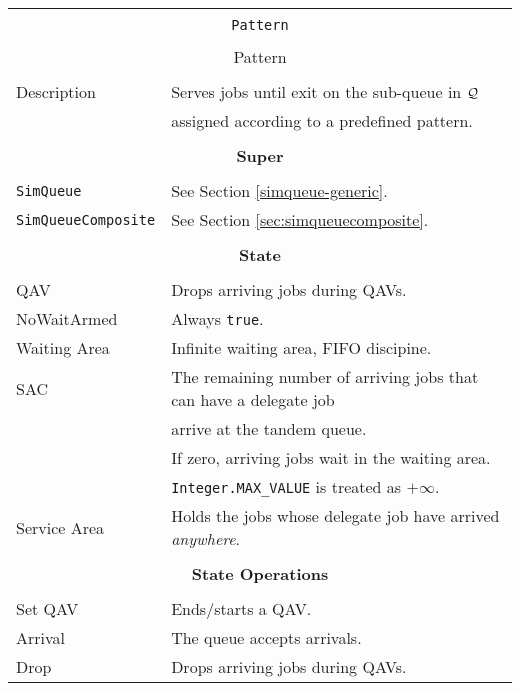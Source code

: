 \begin{tabular}{|l|l|}
	\hline
	\multicolumn{2}{|c|}{} \\
	\multicolumn{2}{|c|}{\lstinline[basicstyle=\large]{Pattern}} \\
	\multicolumn{2}{|c|}{} \\
	\multicolumn{2}{|c|}{Pattern} \\
	\multicolumn{2}{|c|}{} \\
	\hline
	Description & Serves jobs until exit on the sub-queue in $\cal{Q}$ \\
	& assigned according to a predefined pattern. \\
	\hline
	\multicolumn{2}{|c|}{} \\
	\multicolumn{2}{|c|}{\bf Super} \\
	\multicolumn{2}{|c|}{} \\
	\hline
	\lstinline|SimQueue| & See Section \ref{simqueue-generic}. \\
	\lstinline|SimQueueComposite| & See Section \ref{sec:simqueuecomposite}. \\
	\hline
	\multicolumn{2}{|c|}{} \\
	\multicolumn{2}{|c|}{\bf State} \\
	\multicolumn{2}{|c|}{} \\
	\hline
	QAV & Drops arriving jobs during QAVs. \\
	\hline
	NoWaitArmed & Always \lstinline|true|. \\
	\hline
	Waiting Area & Infinite waiting area, FIFO discipine. \\
	\hline
	SAC & The remaining number of arriving jobs that can have a delegate job \\
	& arrive at the tandem queue. \\
	& If zero, arriving jobs wait in the waiting area. \\
	& \lstinline|Integer.MAX_VALUE| is treated as $+\infty$. \\
	\hline
	Service Area & Holds the jobs whose delegate job have arrived {\em anywhere}. \\
	\hline
	\multicolumn{2}{|c|}{} \\
	\multicolumn{2}{|c|}{\bf State Operations} \\
	\multicolumn{2}{|c|}{} \\
	\hline
	Set QAV & Ends/starts a QAV. \\
	\hline
	Arrival & The queue accepts arrivals. \\
	\hline
	Drop & Drops arriving jobs during QAVs. \\

\end{tabular}
